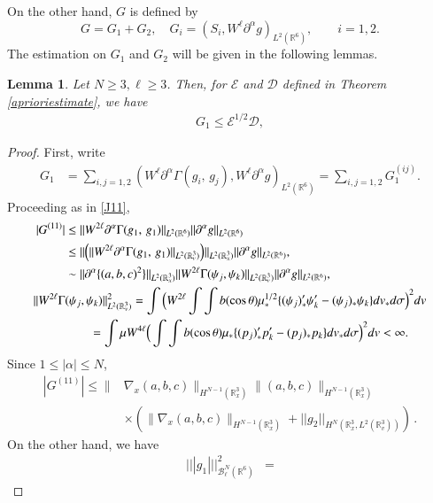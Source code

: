 \documentclass{amsart}[12pt, article]
\newtheorem{lemm}[theo]{Lemma}
\begin{document}
On the other hand, $G$ is defined by
\[
G=G_1+G_2, \quad
G_i=(S_i, W^\ell{{\partial}}^\alpha g)_{L^2({{{\mathbb R}}}^6)}, \qquad i=1,2.
\]
The estimation on $G_1$ and $G_2$ will be given in the following lemmas.
\begin{lemm}\label{G1}
Let $N\ge 3, \ell\ge 3$. Then, for $\mathcal{E}$ and $\mathcal{D}$ defined in   Theorem \ref{aprioriestimate}, we have
\begin{align*}
G_1\le \mathcal{E}^{1/2} \mathcal{D},
\end{align*}
\end{lemm}
\begin{proof} First, write
\begin{align*}
G_1&=\sum_{i,j=1,2}(W^\ell{{\partial}}^\alpha \Gamma(g_i,\,g_j), W^\ell{{\partial}}^\alpha g)_{L^2({{{\mathbb R}}}^6)}
=\sum_{i,j=1,2}G_1^{(ij)}.
\end{align*}
Proceeding as in \eqref{J11},
\begin{align}\label{G11}
|G^{(11)}|&\le
\|W^{2\ell}{{\partial}}^\alpha\Gamma(g_1,\,g_1)\|_{L^2({{{\mathbb R}}}^6)}    \|{{\partial}}^\alpha g\|_{L^2({{{\mathbb R}}}^6)}
\\&
\notag
\le \|\Big(\|W^{2\ell}{{\partial}}^\alpha \Gamma(g_1,\,g_1)\|_{L^2({{{\mathbb R}}}^3_v)}\Big)\|_{L^2({{{\mathbb R}}}^3_x)}
\|{{\partial}}^\alpha g\|_{L^2({{{\mathbb R}}}^6)},
\\& \notag
\sim \|{{\partial}}^\alpha\{(a,b,c)^2\}\|_{L^2({{{\mathbb R}}}^3_x)}\|W^{2\ell}\Gamma(\psi_j,\psi_k)\|_{L^2({{{\mathbb R}}}^3_v)}
\|{{\partial}}^\alpha g\|_{L^2({{{\mathbb R}}}^6)},
\\ \notag
\|W^{2\ell}\Gamma&(\psi_j,\psi_k)\|_{L^2({{{\mathbb R}}}^3_v)}^2=
\int\Big(W^{2\ell}\int\int b(\cos\theta)\mu_*^{1/2}
\{ (\psi_j)_*' \psi_k'-(\psi_j)_*\psi_k\}dv_*d\sigma\Big)^2dv \notag
\\&\qquad \notag
=\int\mu W^{4\ell}\Big(\int\int b(\cos\theta)\mu_*
\{ (p_j)_*' p_k'-(p_j)_*p_k\}dv_*d\sigma\Big)^2dv<\infty.
\end{align}
Since $1\le|\alpha|\le N$,
\begin{align*}
|G^{(11)}|\le \|&\nabla_x(a,b,c)\|_{H^{N-1}({{{\mathbb R}}}^3_x)}\|(a,b,c)\|_{H^{N-1}({{{\mathbb R}}}^3_x)}
\\&\times 
(\|\nabla_x(a,b,c)\|_{H^{N-1}({{{\mathbb R}}}^3_x)}+|| g_2 ||_{H^N({{{\mathbb R}}}^3_x, L^2({{{\mathbb R}}}^3_v))})\,.
\end{align*}
On the other hand, we have
\begin{align*}
||| g_1|||_{{{\mathcal B}}^{N}_\ell({{{\mathbb R}}}^6)}^2&=

\end{align*}
\end{proof}
\end{document}
